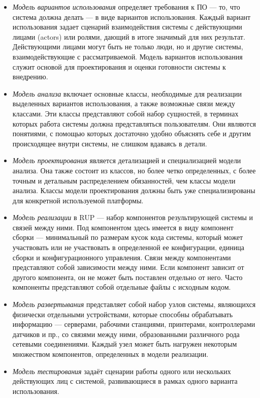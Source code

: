 \documentclass{../../text-style}
\begin{document}
\begin{itemize}
    \item \emph{Модель вариантов использования} определяет требования к ПО --- то, что система должна делать --- в виде вариантов использования. Каждый вариант использования задает сценарий взаимодействия системы с действующими лицами (actors) или ролями, дающий в итоге значимый для них результат. Действующими лицами могут быть не только люди, но и другие системы, взаимодействующие с рассматриваемой. Модель вариантов использования служит основой для проектирования и оценки готовности системы к внедрению.
    \item \emph{Модель анализа} включает основные классы, необходимые для реализации выделенных вариантов использования, а также возможные связи между классами. Эти классы представляют собой набор сущностей, в терминах которых работа системы должна представляться пользователям. Они являются понятиями, с помощью которых достаточно удобно объяснять себе и другим происходящее внутри системы, не слишком вдаваясь в детали.
    \item \emph{Модель проектирования} является детализацией и специализацией модели анализа. Она также состоит из классов, но более четко определенных, с более точным и детальным распределением обязанностей, чем классы модели анализа. Классы модели проектирования должны быть уже специализированы для конкретной используемой платформы.
    \item \emph{Модель реализации} в RUP --- набор компонентов результирующей системы и связей между ними. Под компонентом здесь имеется в виду компонент сборки --- минимальный по размерам кусок кода системы, который может участвовать или не участвовать в определенной ее конфигурации, единица сборки и конфигурационного управления. Связи между компонентами представляют собой зависимости между ними. Если компонент зависит от другого компонента, он не может быть поставлен отдельно от него. Часто компоненты представляют собой отдельные файлы с исходным кодом.
    \item \emph{Модель развертывания} представляет собой набор узлов системы, являющихся физически отдельными устройствами, которые способны обрабатывать информацию --- серверами, рабочими станциями, принтерами, контроллерами датчиков и пр., со связями между ними, образованными различного рода сетевыми соединениями. Каждый узел может быть нагружен некоторым множеством компонентов, определенных в модели реализации. 
    \item \emph{Модель тестирования} задаёт сценарии работы одного или нескольких действующих лиц с системой, развивающиеся в рамках одного варианта использования.
\end{itemize}
\end{document}
